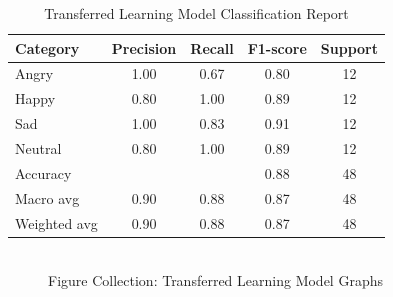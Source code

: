 \begin{table}[H]
    \centering
    \renewcommand{\arraystretch}{1.5}
    \begin{tabular*}{\textwidth}{
        @{\extracolsep{\fill}}
        l
        S[table-format=1.2]
        S[table-format=1.2]
        S[table-format=1.2]
        S[table-format=4.0]
    }
      \toprule
      \textbf{Category} & {\textbf{Precision}} & {\textbf{Recall}} & {\textbf{F1-score}} & {\textbf{Support}} \\
      \midrule
      Angry & 1.00 & 0.67 & 0.80 & 12 \\
      Happy & 0.80 & 1.00 & 0.89 & 12 \\
      Sad & 1.00 & 0.83 & 0.91 & 12 \\
      Neutral & 0.80 & 1.00 & 0.89 & 12 \\
      \midrule
      Accuracy & & & 0.88 & 48 \\
      Macro avg & 0.90 & 0.88 & 0.87 & 48 \\
      Weighted avg & 0.90 & 0.88 & 0.87 & 48 \\
      \bottomrule
    \end{tabular*}
    \caption{Transferred Learning Model Classification Report}
    \label{tab:tf-class-report}
\end{table}
\begin{figure}[H]
    \centering
    \qquad
    \vspace{0.5cm}
    \\
    \scriptsize{Figure Collection: Transferred Learning Model Graphs}
\end{figure}
